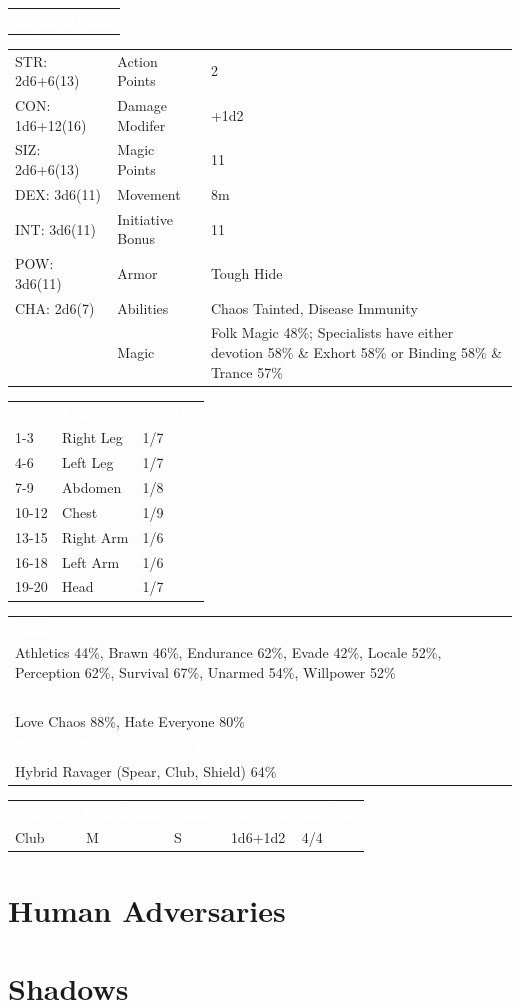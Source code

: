 \documentclass[letterpaper,serif]{rpg-module}
\begin{document}
\begin{tabularx}{\linewidth}{X}
\rowcolor{gray}
\textcolor{white}{\textbf{Chaos Hybrid}}
\end{tabularx}
\begin{tabularx}{\linewidth}{XXX}
STR: 2d6+6(13) & Action Points & 2 \\
CON: 1d6+12(16) & Damage Modifer & +1d2 \\
SIZ: 2d6+6(13) & Magic Points & 11 \\
DEX: 3d6(11) & Movement & 8m \\
INT: 3d6(11) & Initiative Bonus & 11 \\
POW: 3d6(11) & Armor & Tough Hide \\
CHA: 2d6(7) & Abilities & Chaos Tainted, Disease Immunity \\
    & Magic & Folk Magic 48\%; Specialists have either devotion 58\% \& Exhort 58\% or Binding 58\% \& Trance 57\%
\end{tabularx}
\begin{tabularx}{\linewidth}{XXX}
\rowcolor{gray}
\textcolor{white}{\textbf{1d20}} & \textcolor{white}{\textbf{Location}} & \textcolor{white}{\textbf{AP/HP}} \\
1-3 & Right Leg & 1/7 \\
4-6 & Left Leg & 1/7 \\
7-9 & Abdomen & 1/8 \\
10-12 & Chest & 1/9 \\
13-15 & Right Arm & 1/6 \\
16-18 & Left Arm & 1/6 \\
19-20 & Head & 1/7 
\end{tabularx}
\begin{tabularx}{\linewidth}{X}
\rowcolor{gray}
\textcolor{white}{\textbf{Skills}} \\
Athletics 44\%, Brawn 46\%, Endurance 62\%, Evade 42\%, Locale 52\%, Perception 62\%, Survival 67\%, Unarmed 54\%, Willpower 52\%\\
\rowcolor{gray}
\textcolor{white}{\textbf{Passions}} \\
Love Chaos 88\%, Hate Everyone 80\% \\
\rowcolor{gray}
\textcolor{white}{\textbf{Combat Styles \& Weapons}} \\
Hybrid Ravager (Spear, Club, Shield) 64\%
\end{tabularx}
\begin{tabularx}{\linewidth}{XXXXX}
\rowcolor{gray}
\textcolor{white}{\textbf{Weapon}} & \textcolor{white}{\textbf{Size/Force}} & \textcolor{white}{\textbf{Reach}} & \textcolor{white}{\textbf{Damage}} & \textcolor{white}{\textbf{AP/HP}} \\
Club & M & S & 1d6+1d2 & 4/4
\end{tabularx}

\section{Human Adversaries}
\label{npcs_humans}

\section{Shadows}
\label{npcs_shadows}

\pagebreak

\tableofcontents

\end{document}
